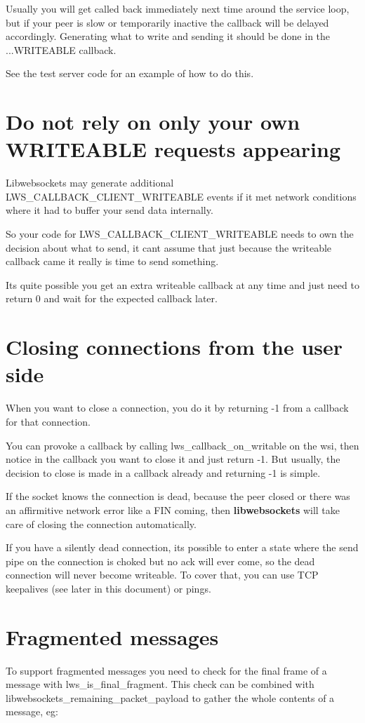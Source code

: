 Usually you will get called back immediately next time around the service loop, but if your peer is slow or temporarily inactive the callback will be delayed accordingly. Generating what to write and sending it should be done in the ...W\+R\+I\+T\+E\+A\+B\+LE callback.

See the test server code for an example of how to do this.\hypertarget{md_README.coding_otherwr}{}\section{Do not rely on only your own W\+R\+I\+T\+E\+A\+B\+L\+E requests appearing}\label{md_README.coding_otherwr}
Libwebsockets may generate additional {\ttfamily L\+W\+S\+\_\+\+C\+A\+L\+L\+B\+A\+C\+K\+\_\+\+C\+L\+I\+E\+N\+T\+\_\+\+W\+R\+I\+T\+E\+A\+B\+LE} events if it met network conditions where it had to buffer your send data internally.

So your code for {\ttfamily L\+W\+S\+\_\+\+C\+A\+L\+L\+B\+A\+C\+K\+\_\+\+C\+L\+I\+E\+N\+T\+\_\+\+W\+R\+I\+T\+E\+A\+B\+LE} needs to own the decision about what to send, it can\textquotesingle{}t assume that just because the writeable callback came it really is time to send something.

It\textquotesingle{}s quite possible you get an \textquotesingle{}extra\textquotesingle{} writeable callback at any time and just need to {\ttfamily return 0} and wait for the expected callback later.\hypertarget{md_README.coding_closing}{}\section{Closing connections from the user side}\label{md_README.coding_closing}
When you want to close a connection, you do it by returning {\ttfamily -\/1} from a callback for that connection.

You can provoke a callback by calling {\ttfamily lws\+\_\+callback\+\_\+on\+\_\+writable} on the wsi, then notice in the callback you want to close it and just return -\/1. But usually, the decision to close is made in a callback already and returning -\/1 is simple.

If the socket knows the connection is dead, because the peer closed or there was an affirmitive network error like a F\+IN coming, then {\bfseries libwebsockets} will take care of closing the connection automatically.

If you have a silently dead connection, it\textquotesingle{}s possible to enter a state where the send pipe on the connection is choked but no ack will ever come, so the dead connection will never become writeable. To cover that, you can use T\+CP keepalives (see later in this document) or pings.\hypertarget{md_README.coding_frags}{}\section{Fragmented messages}\label{md_README.coding_frags}
To support fragmented messages you need to check for the final frame of a message with {\ttfamily lws\+\_\+is\+\_\+final\+\_\+fragment}. This check can be combined with {\ttfamily libwebsockets\+\_\+remaining\+\_\+packet\+\_\+payload} to gather the whole contents of a message, eg\+:


